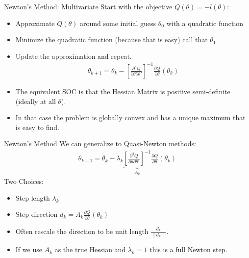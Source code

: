 \documentclass[aspectratio=169]{beamer}
\newcommand{\norm}[1]{\left\lVert#1\right\rVert}
\begin{document}
\begin{frame}{Newton's Method: Multivariate}
Start with the objective $Q(\theta) = - l(\theta)$:
\begin{itemize}
\item Approximate $Q(\theta)$ around some initial guess $\theta_0$ with a quadratic function
\item Minimize the quadratic function (because that is easy) call that $\theta_1$
\item Update the approximation and repeat.
\begin{align*}
\theta_{k+1} = \theta_k - \left[ \frac{\partial^2 Q}{\partial \theta \partial \theta'} \right]^{-1}\frac{\partial Q}{\partial \theta}(\theta_k)
\end{align*}
\item The equivalent SOC is that the {Hessian Matrix} is \alert{positive semi-definite}  (ideally at all $\theta$).
\item In that case the problem is \alert{globally convex} and has a \alert{unique maximum} that is easy to find.
\end{itemize}
\end{frame}


\begin{frame}{Newton's Method}
We can generalize to Quasi-Newton methods:
\begin{align*}
\theta_{k+1} = \theta_k -  \lambda_k \underbrace{\left[ \frac{\partial^2 Q}{\partial \theta \partial \theta'} \right]^{-1}}_{A_k} \frac{\partial Q}{\partial \theta}(\theta_k)
\end{align*}
Two Choices:
\begin{itemize}
\item Step length $\lambda_k$
\item Step direction $d_k=A_k \frac{\partial Q}{\partial \theta}(\theta_k)$
\item Often rescale the direction to be unit length $\frac{d_k}{\norm{d_k}}$.
\item If we use $A_k$ as the true Hessian and $\lambda_k=1$ this is a \alert{full Newton step}.
\end{itemize}
\end{frame}
\end{document}

